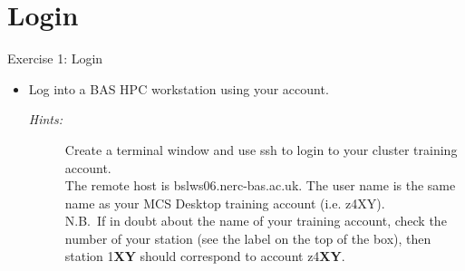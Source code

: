 \documentclass[handout]{beamer} %
\begin{document}
{
\section{Login}
%
\begin{frame}{Exercise 1: Login}
\begin{itemize}
\item{Log into a BAS HPC workstation using your account.}
\begin{description}
\item[\emph{Hints:}]{\small Create a terminal window and use \alert{ssh} to login to your cluster training account. \\\smallskip
The remote host is \alert{bslws06.nerc-bas.ac.uk}. The user name is the same name as your MCS Desktop training account (i.e. \alert{z4XY}).\hfill\\\smallskip
{\scriptsize N.B.\ If in doubt about the name of your training account, check the number of your station (see the label on the top of the box), then station 1\textbf{XY} should correspond to account z4\textbf {XY}.}\hfill\\\smallskip
}
\end{description}
\end{itemize}
\end{frame}
}
\end{document}
